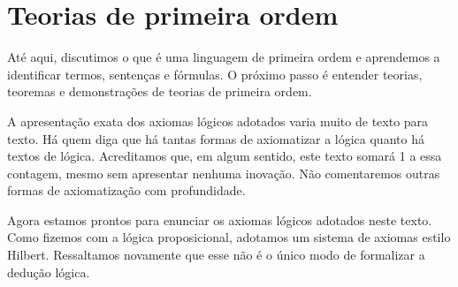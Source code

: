 \section{Teorias de primeira ordem}\label{sec:teoriasPrimeiraOrdem}
Até aqui, discutimos o que é uma linguagem de primeira ordem e aprendemos a identificar termos, sentenças e fórmulas.
O próximo passo é entender teorias, teoremas e demonstrações de teorias de primeira ordem.

A apresentação exata dos axiomas lógicos adotados varia muito de texto para texto.
Há quem diga que há tantas formas de axiomatizar a lógica quanto há textos de lógica.
Acreditamos que, em algum sentido, este texto somará 1 a essa contagem, mesmo sem apresentar nenhuma inovação.
Não comentaremos outras formas de axiomatização com profundidade.

Agora estamos prontos para enunciar os axiomas lógicos adotados neste texto.
Como fizemos com a lógica proposicional, adotamos um sistema de axiomas estilo Hilbert.
Ressaltamos novamente que esse não é o único modo de formalizar a dedução lógica.

